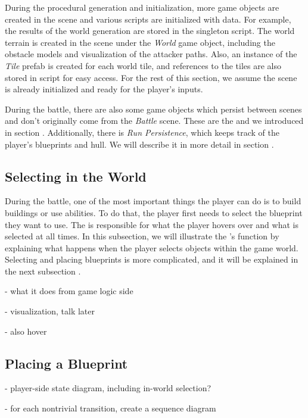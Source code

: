 During the procedural generation and initialization, more game objects are created in the scene and various scripts are initialized with data.
For example, the results of the world generation are stored in the  singleton script.
The world terrain is created in the scene under the \emph{World} game object, including the obstacle models and visualization of the attacker paths.
Also, an instance of the \emph{Tile} prefab is created for each world tile, and references to the tiles are also stored in  script for easy access.
For the rest of this section, we assume the scene is already initialized and ready for the player's inputs.

During the battle, there are also some game objects which persist between scenes and don't originally come from the \emph{Battle} scene.
These are the  and  we introduced in section .
Additionally, there is \emph{Run Persistence}, which keeps track of the player's blueprints and hull.
We will describe it in more detail in section .

\subsection{Selecting in the World}

During the battle, one of the most important things the player can do is to build buildings or use abilities.
To do that, the player first needs to select the blueprint they want to use.
The  is responsible for what the player hovers over and what is selected at all times.
In this subsection, we will illustrate the 's function by explaining what happens when the player selects objects within the game world.
Selecting and placing blueprints is more complicated, and it will be explained in the next subsection .

- what it does from game logic side

- visualization, talk later

- also hover

\subsection{Placing a Blueprint}

- player-side state diagram, including in-world selection?

- for each nontrivial transition, create a sequence diagram






